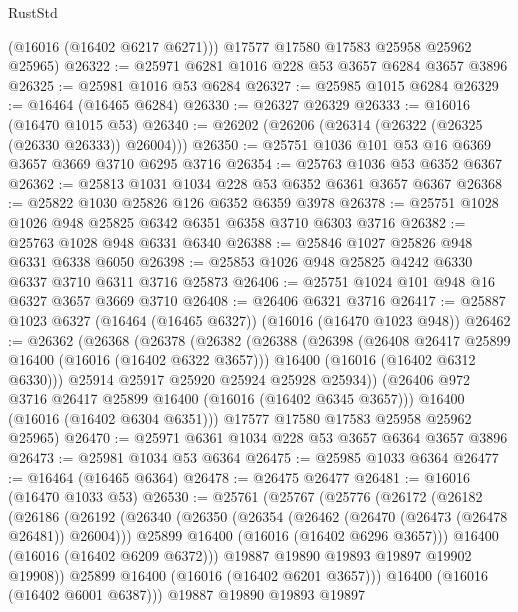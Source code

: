 \begin{lexlean}{RustStd}
\begin{coremodule}
        (@16016 (@16402 @6217 @6271)))
      @17577
      @17580
      @17583
      @25958
      @25962
      @25965)
@26322 := @25971 @6281 @1016 @228 @53 @3657 @6284 @3657 @3896
@26325 := @25981 @1016 @53 @6284
@26327 := @25985 @1015 @6284
@26329 := @16464 (@16465 @6284)
@26330 := @26327 @26329
@26333 := @16016 (@16470 @1015 @53)
@26340 := @26202 (@26206 (@26314 (@26322 (@26325 (@26330 @26333)) @26004)))
@26350 := @25751 @1036 @101 @53 @16 @6369 @3657 @3669 @3710 @6295 @3716
@26354 := @25763 @1036 @53 @6352 @6367
@26362 := @25813 @1031 @1034 @228 @53 @6352 @6361 @3657 @6367
@26368 := @25822 @1030 @25826 @126 @6352 @6359 @3978
@26378 := @25751 @1028 @1026 @948 @25825 @6342 @6351 @6358 @3710 @6303 @3716
@26382 := @25763 @1028 @948 @6331 @6340
@26388 := @25846 @1027 @25826 @948 @6331 @6338 @6050
@26398 := @25853 @1026 @948 @25825 @4242 @6330 @6337 @3710 @6311 @3716 @25873
@26406 := @25751 @1024 @101 @948 @16 @6327 @3657 @3669 @3710
@26408 := @26406 @6321 @3716
@26417 := @25887 @1023 @6327 (@16464 (@16465 @6327)) (@16016 (@16470 @1023 @948))
@26462 := @26362
    (@26368
      (@26378
        (@26382
          (@26388
            (@26398
              (@26408 @26417 @25899 @16400 (@16016 (@16402 @6322 @3657)))
              @16400
              (@16016 (@16402 @6312 @6330)))
            @25914
            @25917
            @25920
            @25924
            @25928
            @25934))
        (@26406 @972 @3716 @26417 @25899 @16400 (@16016 (@16402 @6345 @3657)))
        @16400
        (@16016 (@16402 @6304 @6351)))
      @17577
      @17580
      @17583
      @25958
      @25962
      @25965)
@26470 := @25971 @6361 @1034 @228 @53 @3657 @6364 @3657 @3896
@26473 := @25981 @1034 @53 @6364
@26475 := @25985 @1033 @6364
@26477 := @16464 (@16465 @6364)
@26478 := @26475 @26477
@26481 := @16016 (@16470 @1033 @53)
@26530 := @25761
    (@25767
      (@25776
        (@26172
          (@26182
            (@26186
              (@26192
                (@26340
                  (@26350
                    (@26354 (@26462 (@26470 (@26473 (@26478 @26481)) @26004)))
                    @25899
                    @16400
                    (@16016 (@16402 @6296 @3657)))
                  @16400
                  (@16016 (@16402 @6209 @6372)))
                @19887
                @19890
                @19893
                @19897
                @19902
                @19908))
            @25899
            @16400
            (@16016 (@16402 @6201 @3657)))
          @16400
          (@16016 (@16402 @6001 @6387)))
        @19887
        @19890
        @19893
        @19897

\end{coremodule}
\end{lexlean}
